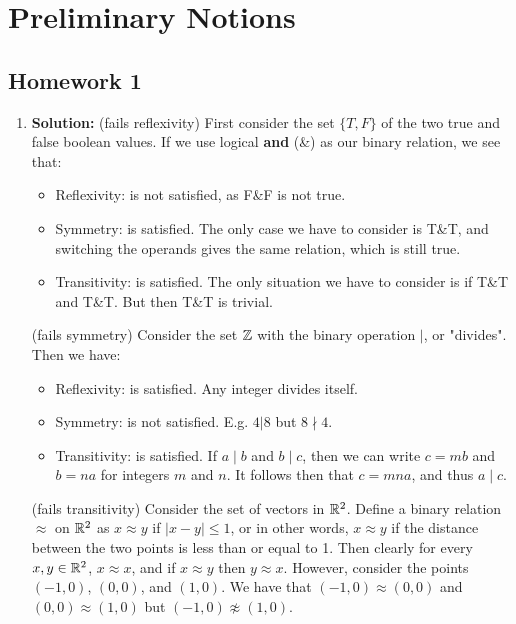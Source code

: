 \section{Preliminary Notions}
\subsection{Homework 1}
\begin{enumerate}
    \item \textbf{Solution:}
    (fails reflexivity) First consider the set $\{T, F\}$ of the two true and false boolean values. If we use logical \textbf{and} (\&) as our binary relation, we see that:
    \begin{itemize}
        \item Reflexivity: is not satisfied, as F\&F is not true.
        \item Symmetry: is satisfied. The only case we have to consider is T\&T, and switching the operands gives the same relation, which is still true.
        \item Transitivity: is satisfied. The only situation we have to consider is if T\&T and T\&T. But then T\&T is trivial.
    \end{itemize}
    
    (fails symmetry) Consider the set $\mathbb{Z}$ with the binary operation $|$, or "divides". Then we have:
    \begin{itemize}
        \item Reflexivity: is satisfied. Any integer divides itself.
        \item Symmetry: is not satisfied. E.g. $4 | 8$ but $8 \nmid 4$.
        \item Transitivity: is satisfied. If $a \mid b$ and $b \mid c$, then we can write $c = mb$ and $b = na$ for integers $m$ and $n$. It follows then that $c = mna$, and thus $a \mid c$.
    \end{itemize}
    
    (fails transitivity) Consider the set of vectors in $\mathbb{R}^2$. Define a binary relation $\approx$ on $\mathbb{R}^2$ as $x \approx y$ if $|x - y| \leq 1$, or in other words, $x \approx y$ if the distance between the two points is less than or equal to 1. Then clearly for every $x, y \in \mathbb{R}^2$, $x \approx x$, and if $x \approx y$ then $y \approx x$. However, consider the points $(-1, 0)$, $(0, 0)$, and $(1, 0)$. We have that $(-1, 0) \approx (0, 0)$ and $(0, 0) \approx (1, 0)$ but $(-1, 0) \not\approx (1, 0)$.
    

\end{enumerate}
